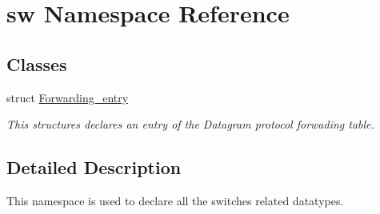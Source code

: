 \hypertarget{namespacesw}{}\section{sw Namespace Reference}
\label{namespacesw}
\subsection*{Classes}
\begin{DoxyCompactItemize}
\item 
struct \hyperlink{structsw_1_1Forwarding__entry}{Forwarding\+\_\+entry}
\begin{DoxyCompactList}\small\item\em This structures declares an entry of the Datagram protocol forwading table. \end{DoxyCompactList}\end{DoxyCompactItemize}


\subsection{Detailed Description}
This namespace is used to declare all the switches related datatypes. 